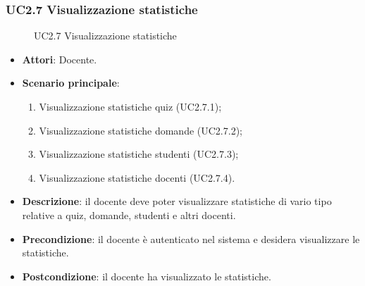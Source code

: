 \subsubsection{UC2.7 Visualizzazione statistiche}
\begin{figure}[H]
\centering
\noindent{}
\caption{UC2.7 Visualizzazione statistiche}
\end{figure}
\begin{itemize}
\item \textbf{Attori}: Docente.
\item \textbf{Scenario principale}:
\begin{enumerate}
\item Visualizzazione statistiche quiz (UC2.7.1);
\item Visualizzazione statistiche domande (UC2.7.2);
\item Visualizzazione statistiche studenti (UC2.7.3);
\item Visualizzazione statistiche docenti (UC2.7.4).
\end{enumerate}
\item \textbf{Descrizione}: il docente deve poter visualizzare statistiche di vario tipo relative a quiz, domande, studenti e altri docenti.
\item \textbf{Precondizione}: il docente è autenticato nel sistema e desidera visualizzare le statistiche.
\item \textbf{Postcondizione}: il docente ha visualizzato le statistiche.
\end{itemize}
